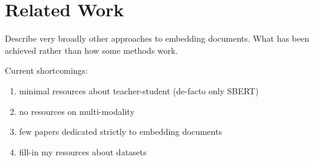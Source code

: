 \chapter{Related Work}

Describe very broadly other approaches to embedding documents. What has been
achieved rather than how some methods work.

Current shortcomings:

\begin{enumerate}

  \item minimal resources about teacher-student (de-facto only SBERT)

  \item no resources on multi-modality

  \item few papers dedicated strictly to embedding documents

  \item fill-in my resources about datasets

\end{enumerate}


